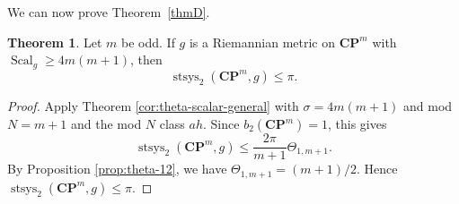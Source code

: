 \documentclass[11pt,reqno]{amsart}
\numberwithin{equation}{section}
\numberwithin{equation}{section}
\theoremstyle{definition}
\newtheorem{theorem}{Theorem}[section]
\newcommand{\CP}{\mathbf{CP}}
\DeclareMathOperator{\Scal}{Scal}
\DeclareMathOperator{\stsys}{stsys}
\begin{document}
We can now prove Theorem~\ref{thmD}.
\begin{theorem}\label{cor:CP-scalar}
Let \(m\) be odd. If \(g\) is a Riemannian metric on \(\CP^m\) with \(\Scal_g\ge4m(m+1)\), then
\[
\stsys_2(\CP^m,g)
\le
\pi.
\]
\end{theorem}

\begin{proof}
Apply Theorem \ref{cor:theta-scalar-general} with \(\sigma=4m(m+1)\) and mod \(N=m+1\) and the mod $N$ class $ah$. Since \(b_2(\CP^m)=1\), this gives
\[\stsys_2(\CP^m,g) \leq  \frac{2\pi}{m+1} \Theta_{1,m+1} .\]
By Proposition \ref{prop:theta-12}, we have \(\Theta_{1,m+1}=(m+1)/2\). Hence \(\stsys_2(\CP^m,g)\le\pi\).
\end{proof}


\end{document}
